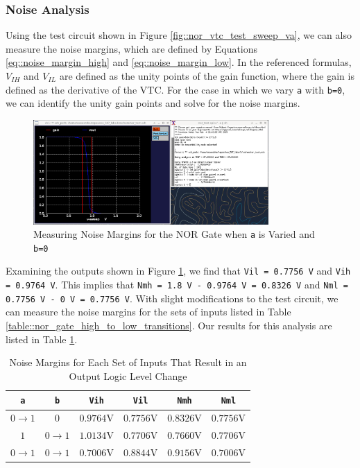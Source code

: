 \documentclass[fleqn]{article}
\begin{document}
	\subsubsection{Noise Analysis}
	
	Using the test circuit shown in Figure \ref{fig::nor_vtc_test_sweep_va}, we can also measure the noise margins, which are defined by Equations \ref{eq::noise_margin_high} and \ref{eq::noise_margin_low}. In the referenced formulas, $V_{IH}$ and $V_{IL}$ are defined as the unity points of the gain function, where the gain is defined as the derivative of the VTC. For the case in which we vary \texttt{a} with \texttt{b=0}, we can identify the unity gain points and solve for the noise margins.
	
	\begin{figure}[H]
		\centerline{\includegraphics[width=0.8\textwidth]{nor_noise_analysis_sweep_va.png}}
		\caption{Measuring Noise Margins for the NOR Gate when \texttt{a} is Varied and \texttt{b=0}}	\label{fig::nor_noise_analysis_sweep_va}
	\end{figure}
	
	Examining the outputs shown in Figure \ref{fig::nor_noise_analysis_sweep_va}, we find that \texttt{Vil = 0.7756 V} and \texttt{Vih = 0.9764 V}. This implies that \texttt{Nmh = 1.8 V - 0.9764 V = 0.8326 V} and \texttt{Nml = 0.7756 V - 0 V = 0.7756 V}. With slight modifications to the test circuit, we can measure the noise margins for the sets of inputs listed in Table \ref{table::nor_gate_high_to_low_transitions}. Our results for this analysis are listed in Table \ref{table::nor_gate_noise_analysis}.
	
	\begin{table}[H]
	\begin{center}
	\caption{Noise Margins for Each Set of Inputs That Result in an Output Logic Level Change}
	\label{table::nor_gate_noise_analysis}
	\begin{tabular}{| c | c | c | c | c | c |}
		\hline
		\texttt{a} & \texttt{b} & \texttt{Vih} & \texttt{Vil} & \texttt{Nmh} & \texttt{Nml} \\
		\hline	
		$0 \rightarrow 1$ & $0$ & $0.9764 \text{V}$ & $0.7756 \text{V}$ & $0.8326 \text{V}$ & $0.7756 \text{V}$\\
		\hline	
		$1$ & $0 \rightarrow 1$ & $1.0134 \text{V}$ & $0.7706 \text{V}$ & $0.7660 \text{V}$ & $0.7706 \text{V}$\\
		\hline	
		$0 \rightarrow 1$ & $0 \rightarrow 1$ & $0.7006 \text{V}$ & $0.8844 \text{V}$ & $0.9156 \text{V}$ & $0.7006 \text{V}$\\
		\hline
	\end{tabular}
	\end{center}
	\end{table}
	
\end{document}
